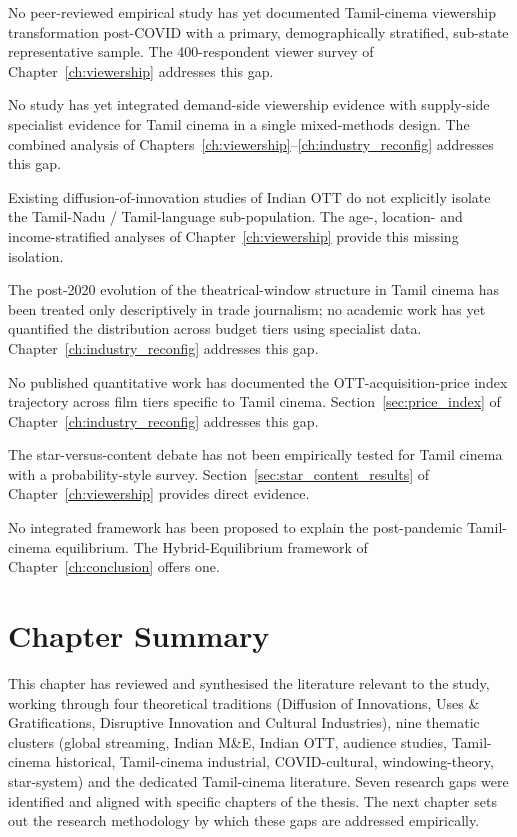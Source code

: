 \begin{description}[style=nextline,leftmargin=2.4em]
\item[Gap 1.] No peer-reviewed empirical study has yet documented
       Tamil-cinema viewership transformation post-COVID with a
       primary, demographically stratified, sub-state representative
       sample.  The 400-respondent viewer survey of
       Chapter~\ref{ch:viewership} addresses this gap.
\item[Gap 2.] No study has yet integrated demand-side viewership
       evidence with supply-side specialist evidence for Tamil
       cinema in a single mixed-methods design.  The combined
       analysis of Chapters~\ref{ch:viewership}--\ref{ch:industry_reconfig}
       addresses this gap.
\item[Gap 3.] Existing diffusion-of-innovation studies of Indian
       OTT do not explicitly isolate the Tamil-Nadu /
       Tamil-language sub-population.  The age-, location- and
       income-stratified analyses of Chapter~\ref{ch:viewership}
       provide this missing isolation.
\item[Gap 4.] The post-2020 evolution of the theatrical-window
       structure in Tamil cinema has been treated only descriptively
       in trade journalism; no academic work has yet quantified the
       distribution across budget tiers using specialist data.
       Chapter~\ref{ch:industry_reconfig} addresses this gap.
\item[Gap 5.] No published quantitative work has documented the
       OTT-acquisition-price index trajectory across film tiers
       specific to Tamil cinema.  Section~\ref{sec:price_index} of
       Chapter~\ref{ch:industry_reconfig} addresses this gap.
\item[Gap 6.] The star-versus-content debate has not been
       empirically tested for Tamil cinema with a probability-style
       survey.  Section~\ref{sec:star_content_results} of
       Chapter~\ref{ch:viewership} provides direct evidence.
\item[Gap 7.] No integrated framework has been proposed to explain
       the post-pandemic Tamil-cinema equilibrium.  The
       Hybrid-Equilibrium framework of Chapter~\ref{ch:conclusion}
       offers one.
\end{description}

\section{Chapter Summary}
\label{sec:lit_summary}

This chapter has reviewed and synthesised the literature relevant
to the study, working through four theoretical traditions
(Diffusion of Innovations, Uses \& Gratifications, Disruptive
Innovation and Cultural Industries), nine thematic clusters (global
streaming, Indian M\&E, Indian OTT, audience studies, Tamil-cinema
historical, Tamil-cinema industrial, COVID-cultural,
windowing-theory, star-system) and the dedicated Tamil-cinema
literature.  Seven research gaps were identified and aligned with
specific chapters of the thesis.  The next chapter sets out the
research methodology by which these gaps are addressed empirically.
